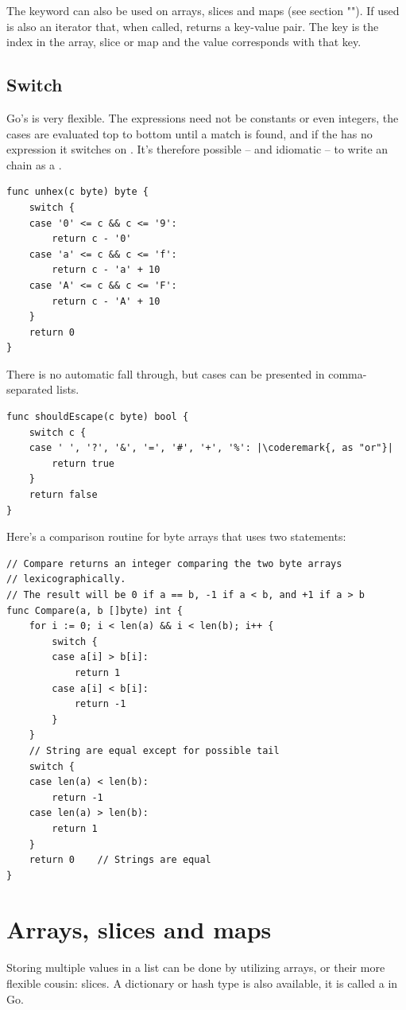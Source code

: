 The  keyword can also be used on arrays, slices and maps
(see section ""). If used  is also an
iterator that, when called, returns a key-value pair. The key is the
index in the array, slice or map and the value corresponds with that
key.
\subsection{Switch}
Go's  is very flexible. The expressions need
not be
constants or even integers, the cases are evaluated top to bottom until
a match is found, and if the  has no expression it switches on
. It's therefore possible -- and idiomatic -- to write an
 chain as a .
\begin{lstlisting}
func unhex(c byte) byte {
    switch {
    case '0' <= c && c <= '9':
        return c - '0'
    case 'a' <= c && c <= 'f':
        return c - 'a' + 10
    case 'A' <= c && c <= 'F':
        return c - 'A' + 10
    }
    return 0
}
\end{lstlisting}
There is no automatic fall through, but cases can be presented in comma-separated lists.

\begin{lstlisting}
func shouldEscape(c byte) bool {
    switch c {
    case ' ', '?', '&', '=', '#', '+', '%': |\coderemark{, as "or"}|
        return true
    }
    return false
}
\end{lstlisting}
Here's a comparison routine for byte arrays that uses two  statements:

\begin{lstlisting}
// Compare returns an integer comparing the two byte arrays
// lexicographically.
// The result will be 0 if a == b, -1 if a < b, and +1 if a > b
func Compare(a, b []byte) int {
    for i := 0; i < len(a) && i < len(b); i++ {
        switch {
        case a[i] > b[i]:
            return 1
        case a[i] < b[i]:
            return -1
        }
    }
    // String are equal except for possible tail
    switch {
    case len(a) < len(b):
        return -1
    case len(a) > len(b):
        return 1
    }
    return 0	// Strings are equal
}
\end{lstlisting}

\section{Arrays, slices and maps}
\label{sec:arrays}
Storing multiple values in a list can be done by utilizing arrays, or
their more flexible cousin: slices. A dictionary or hash type is also
available, it is called a  in Go.

